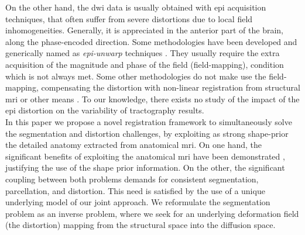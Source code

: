 On the other hand, the \ac{dwi} data is usually obtained with \ac{epi}
acquisition techniques, that often suffer from severe distortions due to 
local field inhomogeneities. Generally, it is appreciated in the anterior
part of the brain, along the phase-encoded direction. Some methodologies have
been developed and generically named as \emph{\ac{epi}-unwarp} techniques
\cite{holland_efficient_2010,hsu_correction_2009,jezzard_characterization_2005,
reber_correction_2005}. They usually 
require the extra acquisition of the magnitude and phase of
the field (field-mapping), condition which is not always met. Some other 
methodologies do not make use the field-mapping, compensating the distortion
with non-linear registration from structural \ac{mri} or other means
\citep{andersson_modeling_2001}. To our knowledge, there exists no study
of the impact of the \ac{epi} distortion on the variability of tractography
results. \\

In this paper we propose a novel registration framework to simultaneously
solve the segmentation and distortion challenges, by exploiting as strong 
shape-prior the detailed anatomy extracted from anatomical \ac{mri}. On
one hand, the significant benefits of exploiting the anatomical \ac{mri}
have been demonstrated \cite{zollei_improved_2010}, justifying the use
of the shape prior information. On the other, the
significant coupling between both problems demands for consistent
segmentation, parcellation, and distortion. This need is satisfied by
the use of a unique underlying model of our joint approach.
We reformulate the segmentation problem as an inverse problem, where
we seek for an underlying deformation field (the distortion) mapping 
from the structural space into the diffusion space.